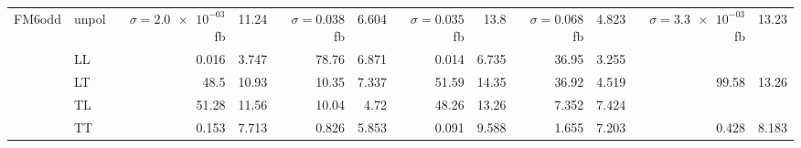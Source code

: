 \begin{table}[h]
{\begin{tabular}{llrrrrrrrrrr}
\midrule
\multirow{5}{*}{FM6odd}
 & unpol & $\sigma = \num{2.0e-03}$ fb & \num{11.24} & $\sigma = \num{0.038}$ fb & \num{6.604} & $\sigma = \num{0.035}$ fb & \num{13.8} & $\sigma = \num{0.068}$ fb & \num{4.823} & $\sigma = \num{3.3e-03}$ fb & \num{13.23} \\
 & LL & \num{0.016} & \num{3.747} & \num{78.76} & \num{6.871} & \num{0.014} & \num{6.735} & \num{36.95} & \num{3.255} &  &  \\
 & LT & \num{48.5} & \num{10.93} & \num{10.35} & \num{7.337} & \num{51.59} & \num{14.35} & \num{36.92} & \num{4.519} & \num{99.58} & \num{13.26} \\
 & TL & \num{51.28} & \num{11.56} & \num{10.04} & \num{4.72} & \num{48.26} & \num{13.26} & \num{7.352} & \num{7.424} &  &  \\
 & TT & \num{0.153} & \num{7.713} & \num{0.826} & \num{5.853} & \num{0.091} & \num{9.588} & \num{1.655} & \num{7.203} & \num{0.428} & \num{8.183} \\
\bottomrule
\end{tabular}
}%
\end{table}
\newpage
